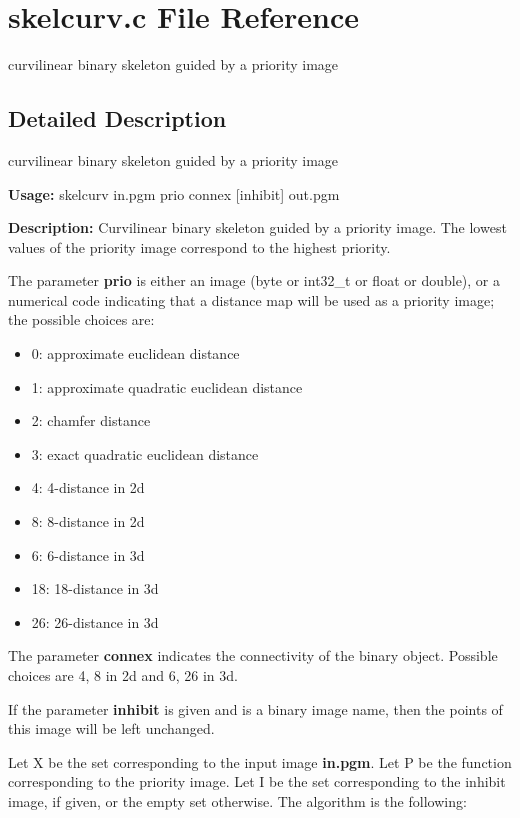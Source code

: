 \section{skelcurv.c File Reference}
\label{skelcurv_8c}
curvilinear binary skeleton guided by a priority image  




\label{_details}
\subsection{Detailed Description}
curvilinear binary skeleton guided by a priority image 

{\bf Usage:} skelcurv in.pgm prio connex [inhibit] out.pgm

{\bf Description:} Curvilinear binary skeleton guided by a priority image. The lowest values of the priority image correspond to the highest priority.

The parameter {\bf prio} is either an image (byte or int32\_\-t or float or double), or a numerical code indicating that a distance map will be used as a priority image; the possible choices are: \begin{itemize}
\item 0: approximate euclidean distance \item 1: approximate quadratic euclidean distance \item 2: chamfer distance \item 3: exact quadratic euclidean distance \item 4: 4-distance in 2d \item 8: 8-distance in 2d \item 6: 6-distance in 3d \item 18: 18-distance in 3d \item 26: 26-distance in 3d\end{itemize}
The parameter {\bf connex} indicates the connectivity of the binary object. Possible choices are 4, 8 in 2d and 6, 26 in 3d.

If the parameter {\bf inhibit} is given and is a binary image name, then the points of this image will be left unchanged.

Let X be the set corresponding to the input image {\bf in.pgm}. Let P be the function corresponding to the priority image. Let I be the set corresponding to the inhibit image, if given, or the empty set otherwise. The algorithm is the following:



